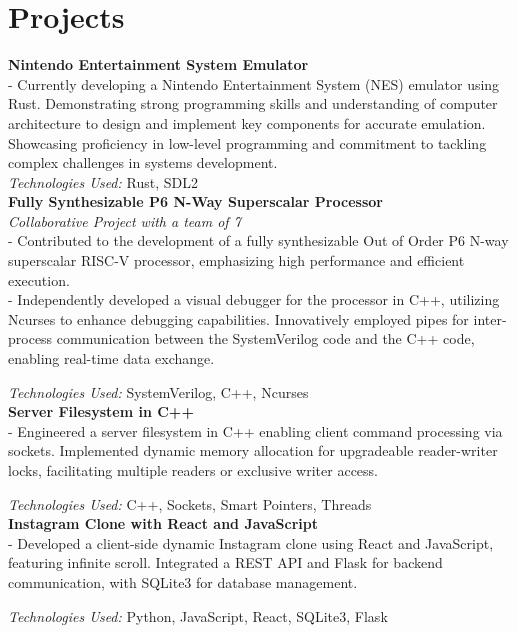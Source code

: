 \documentclass[letterpaper,11pt]{article}
\begin{document}
\section*{Projects}
\textbf{Nintendo Entertainment System Emulator} \\
- Currently developing a Nintendo Entertainment System (NES) emulator using Rust.
Demonstrating strong programming skills and understanding of computer architecture
to design and implement key components for accurate emulation.
Showcasing proficiency in low-level programming and commitment to tackling complex challenges in systems development. \\
\textit{Technologies Used:} Rust, SDL2 \\

\noindent \textbf{Fully Synthesizable P6 N-Way Superscalar Processor} \\
\textit{Collaborative Project with a team of 7} \\
- Contributed to the development of a fully synthesizable Out of Order P6 N-way superscalar RISC-V processor, emphasizing high performance and efficient execution. \\
- Independently developed a visual debugger for the processor in C++,
utilizing Ncurses to enhance debugging capabilities.
Innovatively employed pipes for inter-process communication between the SystemVerilog code
and the C++ code, enabling real-time data exchange.

\textit{Technologies Used:} SystemVerilog, C++, Ncurses \\

\noindent \textbf{Server Filesystem in C++} \\
- Engineered a server filesystem in C++ enabling client command processing via sockets.
Implemented dynamic memory allocation for upgradeable reader-writer locks,
facilitating multiple readers or exclusive writer access.

\textit{Technologies Used:} C++, Sockets, Smart Pointers, Threads \\


\noindent \textbf{Instagram Clone with React and JavaScript} \\
- Developed a client-side dynamic Instagram clone using React and JavaScript,
featuring infinite scroll. Integrated a REST API and Flask for backend communication,
with SQLite3 for database management.

\textit{Technologies Used:} Python, JavaScript, React, SQLite3, Flask
\end{document}
